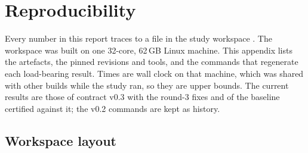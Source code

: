 \section{Reproducibility}\label{sec:reproducibility}

Every number in this report traces to a file in the study workspace . The
workspace was built on one 32-core, 62\,GB Linux machine. This appendix lists the artefacts, the
pinned revisions and tools, and the commands that regenerate each load-bearing result. Times are wall
clock on that machine, which was shared with other builds while the study ran, so they are upper
bounds. The current results are those of contract v0.3 with the round-3 fixes and of the baseline
certified against it; the v0.2 commands are kept as history.

\subsection{Workspace layout}

